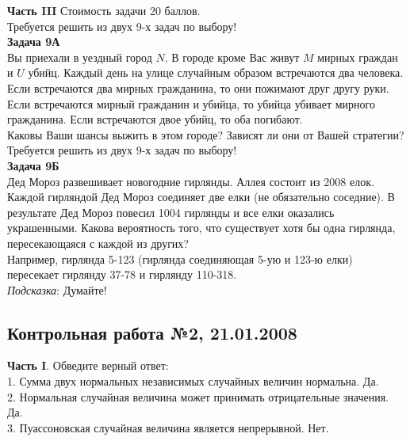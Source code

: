 \documentclass[12pt, a4paper]{article}\usepackage[]{graphicx}\usepackage[]{color}
\begin{document}
	\textbf{Часть III} Стоимость задачи 20 баллов. \\

	Требуется решить \textbf{} из двух 9-х задач по
	выбору! \\


	\textbf{Задача 9А} \\
	Вы приехали в уездный город $N$. В городе кроме Вас живут $M$ мирных граждан и $U$ убийц. Каждый день на улице случайным образом встречаются два человека. Если встречаются два мирных гражданина, то они пожимают друг другу руки. Если встречаются мирный гражданин и убийца, то убийца убивает мирного гражданина. Если встречаются двое убийц, то оба погибают. \\
	Каковы Ваши шансы выжить в этом городе? Зависят ли они от Вашей стратегии?  \\



	Требуется решить \textbf{} из двух 9-х задач по
	выбору! \\



	\textbf{Задача 9Б} \\
	Дед Мороз развешивает новогодние гирлянды. Аллея состоит из 2008 елок. Каждой гирляндой Дед Мороз соединяет две елки (не обязательно соседние). В результате Дед Мороз повесил 1004 гирлянды и все елки оказались украшенными. Какова вероятность того, что существует хотя бы одна гирлянда, пересекающаяся с каждой из других? \\
	Например, гирлянда 5-123 (гирлянда соединяющая 5-ую и 123-ю елки) пересекает гирлянду 37-78 и гирлянду 110-318. \\

	\emph{Подсказка}: Думайте! \\


	\subsection{Контрольная работа №2, 21.01.2008}

	\textbf{Часть I}. Обведите верный ответ: \\

	1. Сумма двух нормальных независимых случайных величин нормальна.
	Да. \\

	2. Нормальная случайная величина может принимать отрицательные
	значения. Да. \\

	3. Пуассоновская случайная величина является непрерывной. Нет.
	\\
\end{document}
